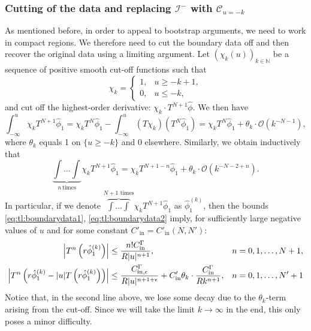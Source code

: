 \documentclass[11pt,english]{article}
\numberwithin{equation}{section}
\theoremstyle{remark}
\theoremstyle{plain}
\theoremstyle{remark}
\renewcommand{\(}{\left(}
\renewcommand{\)}{\right)}
\begin{document}
\subsubsection{Cutting of the data and replacing \texorpdfstring{$\mathcal{I}^-$}{I-} with \texorpdfstring{$\mathcal{C}_{u=-k}$}{C(u=-k)}}\label{sec:tl:cutoffdata}
As mentioned before, in order to appeal to bootstrap arguments, we need to work in compact regions. 
We therefore need to cut the boundary data off and then recover the original data using a limiting argument.  Let $(\chi_k(u))_{k\in\mathbb{N}}$ be a sequence of positive smooth cut-off functions such that
    \begin{equation*}
        \chi_k=\begin{cases}
        1,& u\geq- k+1,\\
        0,&u\leq -k,
        \end{cases}
    \end{equation*}
and cut off the highest-order derivative: $\chi_k \cdot T^{N+1}\hat{\phi}$.
We then have
\begin{equation*}
\int_{-\infty}^u \chi_k T^{N+1}\hat{\phi}_1=\chi_k T^{N}\hat{\phi}_1-\int_{-\infty}^{u}(T\chi_k)( T^{N}\hat{\phi}_1 )=\chi_k T^{N}\hat{\phi}_1+\theta_k\cdot\mathcal{O}(k^{-N-1}),
\end{equation*}
where $\theta_k$ equals 1 on $\{u\geq -k\}$ and 0 elsewhere. Similarly, we obtain inductively that
\begin{equation*}
\underbrace{\int\dots\int}_{n\, \mathrm{ times}} \chi_k T^{N+1}\hat{\phi}_1=\chi_k T^{N+1-n}\hat{\phi}_1+\theta_k\cdot\mathcal{O}(k^{-N-2+n}).
\end{equation*}
In particular, if we denote $\overbrace{\int\dots\int}^{N+1\text{ times}} \chi_k T^{N+1}\hat{\phi}_1$ as $\hat{\phi}_1^{(k)}$, then the bounds  \eqref{eq:tl:boundarydata1}, \eqref{eq:tl:boundarydata2} imply, for sufficiently large negative values of $u$ and for some constant $C'_{\mathrm{in}}=C'_{\mathrm{in}}(N,N')$:
\begin{align}
\left|T^n\left(r\hat{\phi}^{(k)}_1\right)\right|&\leq \frac{n! C_{\mathrm{in}}^\Gamma}{R|u|^{n+1}},&&n=0,1,\dots,N+1,\label{eq:tl:boundarydata1cutoff}\\
\left|T^n\left(r\hat{\phi}^{(k)}_1-|u|T\left(r\hat{\phi}^{(k)}_1\right)\right)\right|&\leq \frac{C_{\mathrm{in},\epsilon}^\Gamma}{R|u|^{n+1+\epsilon}}+C'_{\mathrm{in}}\theta_k\cdot \frac{C_{\mathrm{in}}^\Gamma}{Rk^{n+1}},&& n=0,1,\dots,N'+1\label{eq:tl:boundarydata2cutoff}
\end{align}
Notice that, in the second line above, we lose some decay due to the $\theta_k$-term arising from the cut-off. Since we will take the limit $k\to\infty$ in the end, this only poses a minor difficulty.
\end{document}
